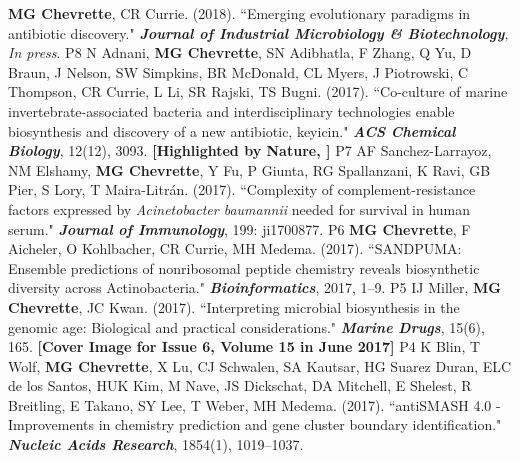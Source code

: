 \begin{cvpubs}
  \cvpub
    {\textbf{MG Chevrette}, CR Currie. (2018). ``Emerging evolutionary paradigms in antibiotic discovery." \textit{\textbf{Journal of Industrial Microbiology \& Biotechnology}, In press}. \textbf{\textit{}}
    } %
    {P8} %
  \cvpub
    {N Adnani, \textbf{MG Chevrette}, SN Adibhatla, F Zhang, Q Yu, D Braun, J Nelson, SW Simpkins, BR McDonald, CL Myers, J Piotrowski, C Thompson, CR Currie, L Li, SR Rajski, TS Bugni. (2017). ``Co-culture of marine invertebrate-associated bacteria and interdisciplinary technologies enable biosynthesis and discovery of a new antibiotic, keyicin." \textit{\textbf{ACS Chemical Biology}}, 12(12), 3093.  \textbf{\textit{}} 
    \linebreak \textbf{[Highlighted by Nature, \textit{}]}
    } %
    {P7} %
  \cvpub
    {AF Sanchez-Larrayoz, NM Elshamy, \textbf{MG Chevrette}, Y Fu, P Giunta, RG Spallanzani, K Ravi, GB Pier, S Lory, T Maira-Litr\'{a}n. (2017). ``Complexity of complement-resistance factors expressed by \textit{Acinetobacter baumannii} needed for survival in human serum." \textit{\textbf{Journal of Immunology}}, 199: ji1700877. \textbf{\textit{}} }%
    {P6} %
  \cvpub
    {\textbf{MG Chevrette}, F Aicheler, O Kohlbacher, CR Currie, MH Medema. (2017). ``SANDPUMA: Ensemble predictions of nonribosomal peptide chemistry reveals biosynthetic diversity across Actinobacteria." \textit{\textbf{Bioinformatics}}, 2017, 1–9. \textbf{\textit{}} } %
    {P5} %
  \cvpub
    {IJ Miller, \textbf{MG Chevrette}, JC Kwan. (2017). ``Interpreting microbial biosynthesis in the genomic age: Biological and practical considerations." \textit{\textbf{Marine Drugs}}, 15(6), 165. \textbf{\textit{}} 
	\linebreak \textbf{[Cover Image for Issue 6, Volume 15 in June 2017]}    
    } %
    {P4} %
  \cvpub
    {K Blin, T Wolf, \textbf{MG Chevrette}, X Lu, CJ Schwalen, SA Kautsar, HG Suarez Duran, ELC de los Santos, HUK Kim, M Nave, JS Dickschat, DA Mitchell, E Shelest, R Breitling, E Takano, SY Lee, T Weber, MH Medema. (2017). ``antiSMASH 4.0 - Improvements in chemistry prediction and gene cluster boundary identification." \textit{\textbf{Nucleic Acids Research}}, 1854(1), 1019–1037. \textbf{\textit{}} }  %

\end{cvpubs}
